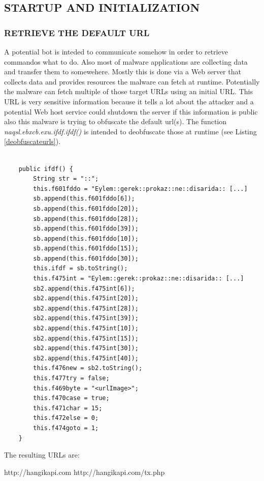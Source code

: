 \documentclass[10pt,titlepage]{article}
\begin{document}
\subsection{STARTUP AND INITIALIZATION}
\subsubsection{RETRIEVE THE DEFAULT URL}
A potential bot is inteded to communicate somehow in order to retrieve commandos what to do. Also most of malware applications are collecting data and transfer them to somewehere. Mostly this is done via a Web server that collects data and provides resources the malware can fetch at runtime. Potentially the malware can fetch multiple of those target URLs using an initial URL. This URL is very sensitive information because it tells a lot about the attacker and a potential Web host service could shutdown the server if this information is public also this malware is trying to obfuscate the default url(s). The function \textit{naqsl.ebxcb.exu.ifdf.ifdf()} is intended to deobfuscate those at runtime (see Listing \ref{deobfuscateurls}).

\begin{lstlisting}[label=deobfuscateurls,caption=The function \textit{naqsl.ebxcb.exu.ifdf.ifdf()} deobfuscates the default URLs.,frame=tb]

    public ifdf() {
        String str = "::";
        this.f601fddo = "Eylem::gerek::prokaz::ne::disarida:: [...]
        sb.append(this.f601fddo[6]);
        sb.append(this.f601fddo[20]);
        sb.append(this.f601fddo[28]);
        sb.append(this.f601fddo[39]);
        sb.append(this.f601fddo[10]);
        sb.append(this.f601fddo[15]);
        sb.append(this.f601fddo[30]);
        this.ifdf = sb.toString();
        this.f475int = "Eylem::gerek::prokaz::ne::disarida:: [...]
        sb2.append(this.f475int[6]);
        sb2.append(this.f475int[20]);
        sb2.append(this.f475int[28]);
        sb2.append(this.f475int[39]);
        sb2.append(this.f475int[10]);
        sb2.append(this.f475int[15]);
        sb2.append(this.f475int[30]);
        sb2.append(this.f475int[40]);
        this.f476new = sb2.toString();
        this.f477try = false;
        this.f469byte = "<urlImage>";
        this.f470case = true;
        this.f471char = 15;
        this.f472else = 0;
        this.f474goto = 1;
    }
\end{lstlisting}

The resulting URLs are:

\begin{spverbatim}
http://hangikapi.com
http://hangikapi.com/tx.php
\end{spverbatim}
\end{document}
